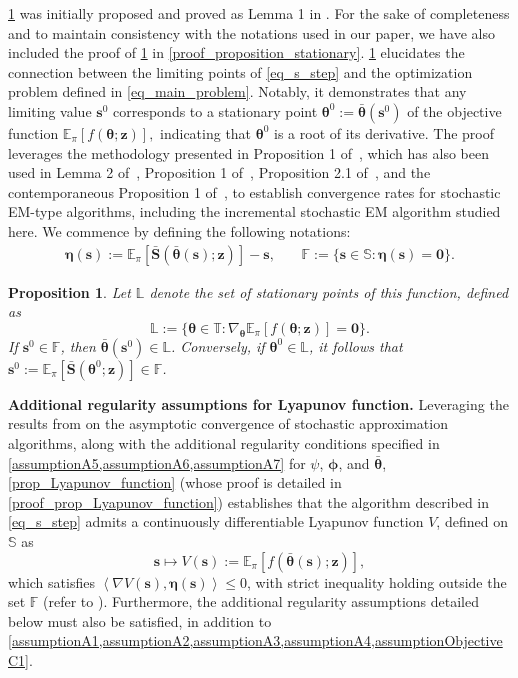 \documentclass{article}
\newcommand{\zero}{\ensuremath{\mathbf{0}}}
\def\phib        {{\sbmm{\phi}}\XS}        \def\Phib       {{\sbmm{\Phi}}\XS}
\def\XS{\xspace}
\def\sbmm#1{\ensuremath{\boldsymbol{#1}}}
\newtheorem{proposition}{Proposition}
\def\eqdef{:=}
\def\PE{\mathbb{E}_\pi} %
\def\param{\vtheta}
\def\barparam{\bar{\param}}
\newcommand{\pscal}[2]{\left\langle#1,#2\right\rangle} %
\def\bars{\bar{\vS}}
\def\lyap{V}
\def\rvz{{\mathbf{z}}}
\def\veta{{\bm{\eta}}}
\def\vtheta{{\bm{\theta}}}
\def\vs{{\bm{s}}}
\def\vS{{\bm{S}}}
\def\sF{{\mathbb{F}}}
\def\sL{{\mathbb{L}}}
\def\sS{{\mathbb{S}}}
\def\sT{{\mathbb{T}}}
\begin{document}
\cref{proposition_stationary} was initially proposed and proved as Lemma 1 in \cite{nguyen_online_2023}. For the sake of completeness and to maintain consistency with the notations used in our paper, we have also included the proof of \cref{proposition_stationary} in \cref{proof_proposition_stationary}. 
\cref{proposition_stationary} elucidates the connection between the limiting points of \cref{eq_s_step} and the optimization problem defined in \cref{eq_main_problem}. Notably, it demonstrates that any limiting value $\vs^0$ corresponds to a stationary point $\vtheta^{0} \eqdef \barparam(\vs^0)$ of the objective function $\PE\left[f\left(\vtheta; \rvz\right)\right],$ indicating that $\vtheta^{0}$ is a root of its derivative. The proof leverages the methodology presented in Proposition 1 of~\cite{cappe_Online_2009}, which has also been used in Lemma 2 of~\cite{delyon_convergence_1999}, Proposition 1 of~\cite{fort_fast_2021}, Proposition 2.1 of~\cite{fort_stochastic_2023}, and the contemporaneous Proposition 1 of~\cite{dieuleveut_federated_2025}, to establish convergence rates for stochastic EM-type algorithms, including the incremental stochastic EM algorithm studied here. We commence by defining the following notations:
\begin{align}\label{eq_def_hsGamma}
    \veta(\vs) \eqdef \PE\left[ \bars\left(\barparam(\vs);\rvz\right)\right] -\vs\text{,} \qquad  \sF \eqdef \{\vs \in \sS:  \veta(\vs) =\zero \}.
\end{align}
\begin{proposition}
\label{proposition_stationary}
Let $\sL$ denote the set of stationary points of this function, defined as
\[
  \sL := \{\vtheta \in \sT : \nabla_\vtheta \PE\left[f(\vtheta;\rvz)\right] = \zero\}.
\]
If $\vs^0 \in \sF$, then $\barparam(\vs^0) \in \sL$. Conversely, if $\vtheta^{0} \in \sL$, it follows that
$\vs^0 \eqdef \PE\left[\bars\left(\vtheta^{0};\rvz\right)\right] \in \sF$.
\end{proposition}

{\bf Additional regularity assumptions for Lyapunov function.}
Leveraging the results from \cite{delyon_convergence_1999} on the asymptotic convergence of stochastic approximation algorithms, along with the additional regularity conditions specified in \cref{assumptionA5,assumptionA6,assumptionA7} for $\psi$, $\phib$, and $\barparam$, \cref{prop_Lyapunov_function} (whose proof is detailed in \cref{proof_prop_Lyapunov_function}) establishes that the algorithm described in \cref{eq_s_step} admits a continuously differentiable Lyapunov function $\lyap$, defined on $\sS$ as  
$$\vs \mapsto V(\vs) \eqdef \PE\left[f(\barparam(\vs); \rvz) \right], $$  
which satisfies $\pscal{\nabla\lyap(\vs)}{\veta(\vs)} \leq 0$, with strict inequality holding outside the set $\sF$ (refer to \citep[Prop. 2]{cappe_Online_2009}).  Furthermore, the additional regularity assumptions detailed below must also be satisfied, in addition to \cref{assumptionA1,assumptionA2,assumptionA3,assumptionA4,assumptionObjectiveC1}.
\end{document}
